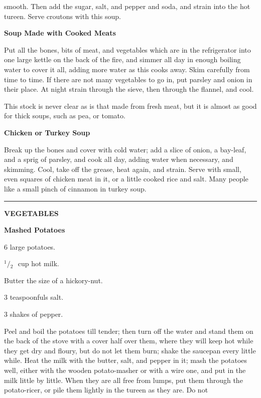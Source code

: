 \documentclass[11pt]{book}
\newcommand{\hstroke}{\rule[0.5ex]{5.0em}{0.2ex}}
\newcommand{\indpar}{\par\noindent\hspace*{\parindent}}
\newcommand{\ingredient}{\indpar}
\newcommand{\instruction}{\indpar}
\newcommand{\OneHalf}{\ensuremath{{}^1\!\!/\!{}_2\mbox{\ }}}
\newenvironment{RecipeTitle}{\medskip\begin{center}\large\bf }{\end{center}\smallskip}
\newenvironment{FoodTypeTitle}{\begin{center}\large\bf }{\end{center}}
\begin{document}
smooth.  Then add the sugar, salt, and pepper and soda,
and strain into the hot tureen.  Serve croutons with
this soup.
\begin{RecipeTitle}
Soup Made with Cooked Meats\label{soup_made_with_cooked_meats}
\end{RecipeTitle}
\instruction  Put all the bones, bits of meat, and vegetables which
are in the refrigerator into one large kettle on the back
of the fire, and simmer all day in enough boiling water
to cover it all, adding more water as this cooks away.
Skim carefully from time to time.  If there are not many
vegetables to go in, put parsley and onion in their place.
At night strain through the sieve, then through the flannel,
and cool.
\instruction  This stock is never clear as is that made from fresh
meat, but it is almost as good for thick soups, such as
pea, or tomato.
\begin{RecipeTitle}
Chicken or Turkey Soup\label{chicken_or_turkey_soup}
\end{RecipeTitle}
\instruction  Break up the bones and cover with cold water; add a slice
of onion, a bay-leaf, and a sprig of parsley, and cook all
day, adding water when necessary, and skimming.  Cool,
take off the grease, heat again, and strain.  Serve with
small, even squares of chicken meat in it, or a little
cooked rice and salt.  Many people like a small pinch of
cinnamon in turkey soup.
\smallskip
\begin{center}
\hstroke
\end{center}
\smallskip
\begin{FoodTypeTitle}
VEGETABLES\label{VEGETABLES}
\end{FoodTypeTitle}
\begin{RecipeTitle}
Mashed Potatoes\label{mashed_potatoes}
\end{RecipeTitle}
\ingredient  6 large potatoes.
\ingredient  \OneHalf cup hot milk.
\ingredient  Butter the size of a hickory-nut.
\ingredient  3 teaspoonfuls salt.
\ingredient  3 shakes of pepper.
\instruction  Peel and boil the potatoes till tender; then turn off
the water and stand them on the back of the stove with
a cover half over them, where they will keep hot while
they get dry and floury, but do not let them burn; shake
the saucepan every little while.  Heat the milk with the
butter, salt, and pepper in it; mash the potatoes well,
either with the wooden potato-masher or with a wire one,
and put in the milk little by little.  When they are all
free from lumps, put them through the potato-ricer, or
pile them lightly in the tureen as they are.  Do not
\end{document}
